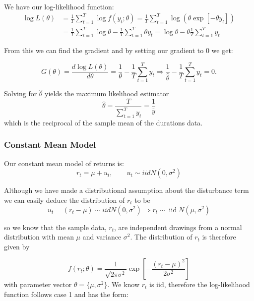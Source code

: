 \documentclass[11pt]{article}
\begin{document}
We have our log-likelihood function:
\begin{equation}
\begin{aligned}
\log L(\theta) & =\frac{1}{T} \sum_{t=1}^T \log f\left(y_t ; \theta\right)=\frac{1}{T} \sum_{t=1}^T \log \left(\theta \exp \left[-\theta y_t\right]\right) \\
& =\frac{1}{T} \sum_{t=1}^T \log \theta-\frac{1}{T} \sum_{t=1}^T \theta y_t=\log \theta-\theta \frac{1}{T} \sum_{t=1}^T y_t
\end{aligned}
\end{equation}

From this we can find the gradient and by setting our gradient to 0 we get:

\begin{equation}
G(\theta)=\frac{d \log L(\theta)}{d \theta}=\frac{1}{\theta}-\frac{1}{T} \sum_{t=1}^T y_t \Rightarrow \frac{1}{\widehat{\theta}}-\frac{1}{T} \sum_{t=1}^T y_t=0 .
\end{equation}

Solving for $\hat{\theta}$ yields the maximum likelihood estimator
\[\hat{\theta} = \dfrac{T}{\sum_{t=1}^T y_t} = \dfrac{1}{\bar{y}}\]
which is the reciprocal of the sample mean of the durations data.

\subsubsection{Constant Mean Model}
Our constant mean model of returns is:
\[r_t = \mu + u_t, \qquad u_t \sim iid N(0,\sigma^2)\]

Although we have made a distributional assumption about the disturbance term we can easily deduce the distribution of $r_t$ to be
\begin{equation}
u_t=\left(r_t-\mu\right) \sim i i d N\left(0, \sigma^2\right) \Rightarrow r_t \sim \operatorname{iid} N\left(\mu, \sigma^2\right)
\end{equation}

so we know that the sample data, $r_t$, are independent drawings from a normal distribution with mean $\mu$ and variance $\sigma^2$. The distribution of $r_t$ is therefore given by

\begin{equation}
f\left(r_t ; \theta\right)=\frac{1}{\sqrt{2 \pi \sigma^2}} \exp \left[-\frac{\left(r_t-\mu\right)^2}{2 \sigma^2}\right]
\end{equation}
with parameter vector $\theta = \{\mu, \sigma^2\}$. We know $r_t$ is iid, therefore the log-likelihood function follows case 1 and has the form:
\end{document}
